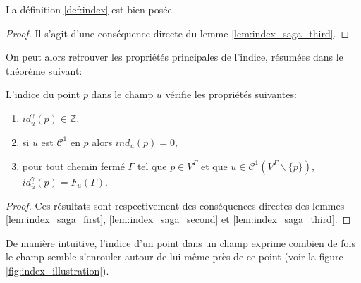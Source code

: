 \begin{proposition}
    La définition \ref{def:index} est bien posée.
\end{proposition}

\begin{proof}
    Il s'agit d'une conséquence directe du lemme \ref{lem:index_saga_third}.
\end{proof}

On peut alors retrouver les propriétés principales de l'indice, résumées dans le théorème suivant:

\begin{theorem}
    L'indice du point $p$ dans le champ $u$ vérifie les propriétés suivantes:
    \begin{enumerate}
        \item $id_{\bar{u}}^\gamma(p)\in\mathbb{Z}$,
        \item si $u$ est $\mathcal{C}^1$ en $p$ alors $ind_u(p)=0$,
        \item pour tout chemin fermé $\Gamma$ tel que $p\in V^\Gamma$ et que $u\in\mathcal{C}^1(V^\Gamma\backslash\{p\})$, $id_{\bar{u}}^\gamma(p)=F_{\bar{u}}(\Gamma)$.
    \end{enumerate}
\end{theorem}

\begin{proof}
    Ces résultats sont respectivement des conséquences directes des lemmes \ref{lem:index_saga_first}, \ref{lem:index_saga_second} et \ref{lem:index_saga_third}.
\end{proof}

De manière intuitive, l'indice d'un point dans un champ exprime combien de fois le champ semble s'enrouler autour de lui-même près de ce point (voir la figure \ref{fig:index_illustration}).

